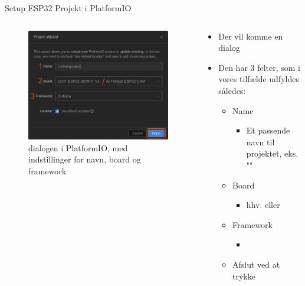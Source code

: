 \documentclass[aspectratio=169]{beamer}
\begin{document}
\begin{frame}{Setup ESP32 Projekt i PlatformIO}
\begin{columns}
	\begin{column}{0.5\textwidth}
		\begin{figure}
  			\includegraphics[height=0.7\textheight,keepaspectratio=true]{assets/pictures/pio-project-2.png}
  			\caption{ dialogen i PlatformIO, med indstillinger for navn, board og framework}
  			\label{fig:pio-project2}
		\end{figure}
	\end{column}
	\begin{column}{0.5\textwidth}
		\begin{textBox}
			\begin{itemize}
				\item Der vil komme en  dialog
				\item Den har 3 felter, som i vores tilfælde udfyldes således:
				\begin{itemize}
					\item Name
					\begin{itemize}
						\item Et passende navn til projektet, eks. ""
					\end{itemize}
					\item Board
					\begin{itemize}
						\item hhv.  eller 
					\end{itemize}
					\item Framework
					\begin{itemize}
						\item {}
					\end{itemize}
					\item Afslut ved at trykke 
				\end{itemize}
			\end{itemize}
		\end{textBox}
	\end{column}
\end{columns}
\end{frame}
\end{document}
